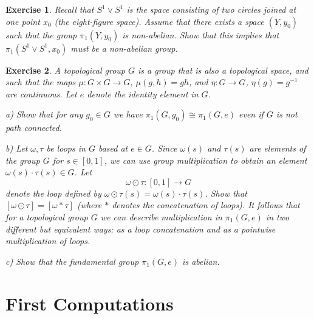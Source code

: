 \documentclass[11pt, letterpaper, oneside]{report}
\renewcommand{\chaptermark}[1]{\markboth{#1}{}}
\theoremstyle{pplain}
\theoremstyle{ddefinition}
\theoremstyle{nnn}
\theoremstyle{eexercise}
\newtheorem{exercise}{Exercise}[chapter]
\begin{document}
\begin{exercise}
Recall that  $S^1\vee S^1$ is the space consisting of two circles joined at one point $x_0$ 
(the eight-figure space).  Assume that there exists a space $(Y,y_0)$ such that the group 
$\pi_1(Y,y_0)$ is non-abelian. Show that this implies that  $\pi_1(S^1\vee S^1, x_0)$ must be 
a non-abelian group. 
\end{exercise}






\begin{exercise}
A {\em topological group} $G$ is a group that is also a topological space,
and such that the maps $\mu\colon G\times G\rightarrow G$, $\mu(g,h)=gh$, and 
$\eta\colon G\rightarrow G$, $\eta(g)=g^{-1}$ are continuous.  Let $e$ denote the 
identity element in $G$. 

a) Show that for any $g_0\in G$ we have $\pi_1(G,g_0)\cong \pi_1(G,e)$
even if $G$ is not path connected. 

b) Let $\omega, \tau$ be loops in $G$ based at $e\in G$. Since 
$\omega(s)$ and $\tau(s)$ are elements of the group $G$ for $s\in [0, 1]$, we can use 
group multiplication to obtain an element $\omega(s)\cdot \tau(s)\in G$. Let 
$$\omega \odot \tau \colon [0, 1]\to G$$
denote the loop defined by $\omega\odot\tau (s) = \omega(s) \cdot \tau(s)$. Show that 
$[\omega\odot\tau] = [\omega\ast\tau]$ (where $\ast$ denotes the concatenation of loops). 
It follows that for a topological group $G$ we can describe multiplication in $\pi_{1}(G, e)$
in two different but equivalent ways: as a loop concatenation and as a pointwise multiplication of loops. 


c) Show that the fundamental group $\pi_1(G, e)$ is abelian.

\end{exercise}






\newpage

\chapter{First Computations}
\chaptermark{First Computations}

\thispagestyle{firststyle}
\end{document}
